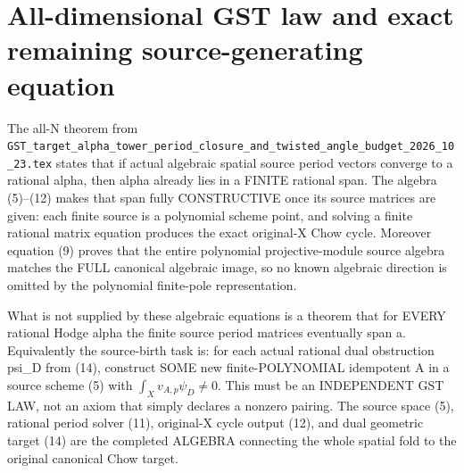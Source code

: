 \documentclass[11pt]{article}
\begin{document}
\section{All-dimensional GST law and exact remaining source-generating equation}
The all-N theorem from
\texttt{GST\_target\_alpha\_tower\_period\_closure\_and\_twisted\_angle\_budget\_2026\_10\_23.tex}
states that if actual algebraic spatial source
period vectors converge to a rational alpha, then
alpha already lies in a FINITE rational span.
The algebra (5)--(12) makes that span fully
CONSTRUCTIVE once its source matrices are given:
each finite source is a polynomial scheme point,
and solving a finite rational matrix equation
produces the exact original-X Chow cycle.
Moreover equation (9) proves that the entire
polynomial projective-module source algebra
matches the FULL canonical algebraic image,
so no known algebraic direction is omitted
by the polynomial finite-pole representation.

What is not supplied by these algebraic equations is
a theorem that for EVERY rational Hodge alpha the
finite source period matrices eventually span a.
Equivalently the source-birth task is:
for each actual rational dual obstruction psi_D
from (14), construct SOME new finite-POLYNOMIAL
idempotent A in a source scheme (5)
with \(\int_X v_{A,p}\psi_D\ne0\).
This must be an INDEPENDENT GST LAW, not an axiom
that simply declares a nonzero pairing.
The source space (5), rational period solver (11),
original-X cycle output (12), and dual
geometric target (14) are the completed
ALGEBRA connecting the whole spatial fold
to the original canonical Chow target.
\end{document}
